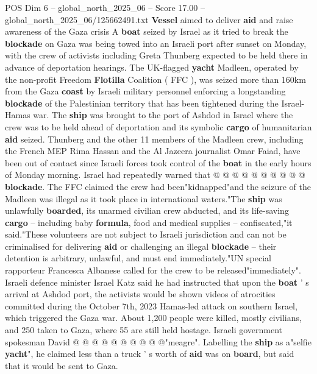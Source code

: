 \begin{textsample}{POS Dim 6 – global\_north\_2025\_06 – Score 17.00 – global\_north\_2025\_06/125662491.txt}  \label{ex:f6_pos_026}
\textbf{Vessel} aimed to deliver \textbf{aid} and raise awareness of the Gaza crisis A \textbf{boat} seized by Israel as it tried to break the \textbf{blockade} on Gaza was being towed into an Israeli port after sunset on Monday, with the crew of activists including Greta Thunberg expected to be held there in advance of deportation hearings.
The UK-flagged \textbf{yacht} Madleen, operated by the non-profit Freedom \textbf{Flotilla} Coalition ( FFC ), was seized more than 160km from the Gaza \textbf{coast} by Israeli military personnel enforcing a longstanding \textbf{blockade} of the Palestinian territory that has been tightened during the Israel-Hamas war.
The \textbf{ship} was brought to the port of Ashdod in Israel where the crew was to be held ahead of deportation and its symbolic \textbf{cargo} of humanitarian \textbf{aid} seized.
Thunberg and the other 11 members of the Madleen crew, including the French MEP Rima Hassan and the Al Jazeera journalist Omar Faiad, have been out of contact since Israeli forces took control of the \textbf{boat} in the early hours of Monday morning.
Israel had repeatedly warned that @ @ @ @ @ @ @ @ @ @ \textbf{blockade}.
The FFC claimed the crew had been"kidnapped"and the seizure of the Madleen was illegal as it took place in international waters."The \textbf{ship} was unlawfully \textbf{boarded}, its unarmed civilian crew abducted, and its life-saving \textbf{cargo} -- including baby \textbf{formula}, food and medical supplies -- confiscated,"it said."These volunteers are not subject to Israeli jurisdiction and can not be criminalised for delivering \textbf{aid} or challenging an illegal \textbf{blockade} -- their detention is arbitrary, unlawful, and must end immediately."UN special rapporteur Francesca Albanese called for the crew to be released"immediately".
Israeli defence minister Israel Katz said he had instructed that upon the \textbf{boat} ' s arrival at Ashdod port, the activists would be shown videos of atrocities committed during the October 7th, 2023 Hamas-led attack on southern Israel, which triggered the Gaza war.
About 1,200 people were killed, mostly civilians, and 250 taken to Gaza, where 55 are still held hostage.
Israeli government spokesman David @ @ @ @ @ @ @ @ @ @"meagre".
Labelling the \textbf{ship} as a"selfie \textbf{yacht}", he claimed less than a truck ' s worth of \textbf{aid} was on \textbf{board}, but said that it would be sent to Gaza.

\end{textsample}
